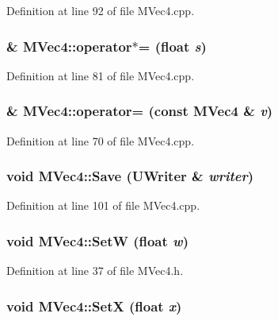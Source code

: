 Definition at line 92 of file MVec4.cpp.\hypertarget{class_m_vec4_2e7a5d6567a19a2fc4180ae087bf0065}{
\subsubsection[{operator$\ast$=}]{ \& MVec4::operator$\ast$= (float {\em s})}}
\label{class_m_vec4_2e7a5d6567a19a2fc4180ae087bf0065}




Definition at line 81 of file MVec4.cpp.\hypertarget{class_m_vec4_ad49be52b3a9700dca53ee4f98adb939}{
\subsubsection[{operator=}]{ \& MVec4::operator= (const {\bf MVec4} \& {\em v})}}
\label{class_m_vec4_ad49be52b3a9700dca53ee4f98adb939}




Definition at line 70 of file MVec4.cpp.\hypertarget{class_m_vec4_e679677819d33edb08eba1da0a0d351c}{
\subsubsection[{Save}]{\setlength{\rightskip}{0pt plus 5cm}void MVec4::Save ({\bf UWriter} \& {\em writer})}}
\label{class_m_vec4_e679677819d33edb08eba1da0a0d351c}




Definition at line 101 of file MVec4.cpp.\hypertarget{class_m_vec4_c505914a9151b362d6d73cbe509fac4a}{
\subsubsection[{SetW}]{\setlength{\rightskip}{0pt plus 5cm}void MVec4::SetW (float {\em w})}}
\label{class_m_vec4_c505914a9151b362d6d73cbe509fac4a}




Definition at line 37 of file MVec4.h.\hypertarget{class_m_vec4_932107856bc0fa095314f3f0d509b6ad}{
\subsubsection[{SetX}]{\setlength{\rightskip}{0pt plus 5cm}void MVec4::SetX (float {\em x})}}
\label{class_m_vec4_932107856bc0fa095314f3f0d509b6ad}




